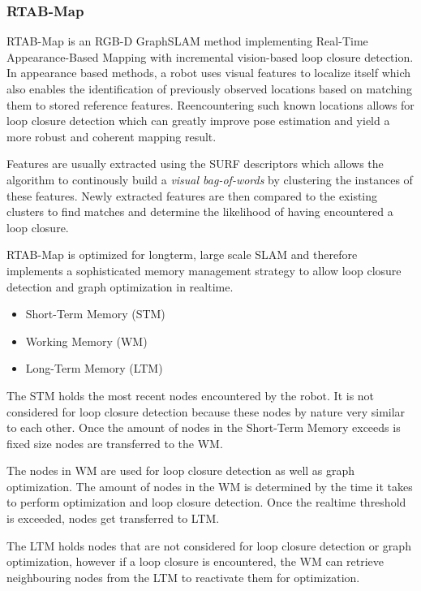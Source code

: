 \documentclass[10pt,journal,compsoc]{IEEEtran}
\begin{document}
\subsubsection{RTAB-Map}
RTAB-Map is an RGB-D GraphSLAM method implementing Real-Time Appearance-Based Mapping with incremental vision-based loop closure detection. In appearance based methods, a robot uses visual features to localize itself which also enables the identification of previously observed locations based on matching them to stored reference features. Reencountering such known locations allows for loop closure detection which can greatly improve pose estimation and yield a more robust and coherent mapping result.

Features are usually extracted using the SURF\cite{leonardis_surf:_2006} descriptors which allows the algorithm to continously build a \textit{visual bag-of-words} by clustering the instances of these features. Newly extracted features are then compared to the existing clusters to find matches and determine the likelihood of having encountered a loop closure.

RTAB-Map is optimized for longterm, large scale SLAM and therefore implements a sophisticated memory management strategy to allow loop closure detection and graph optimization in realtime.
\begin{itemize}
    \item Short-Term Memory (STM)
    \item Working Memory (WM)
    \item Long-Term Memory (LTM)
\end{itemize}
The STM holds the most recent nodes encountered by the robot. It is not considered for loop closure detection because these nodes by nature very similar to each other. Once the amount of nodes in the Short-Term Memory exceeds is fixed size nodes are transferred to the WM.

The nodes in WM are used for loop closure detection as well as graph optimization. The amount of nodes in the WM is determined by the time it takes to perform optimization and loop closure detection. Once the realtime threshold is exceeded, nodes get transferred to LTM.

The LTM holds nodes that are not considered for loop closure detection or graph optimization, however if a loop closure is encountered, the WM can retrieve neighbouring nodes from the LTM to reactivate them for optimization.

\end{document}

